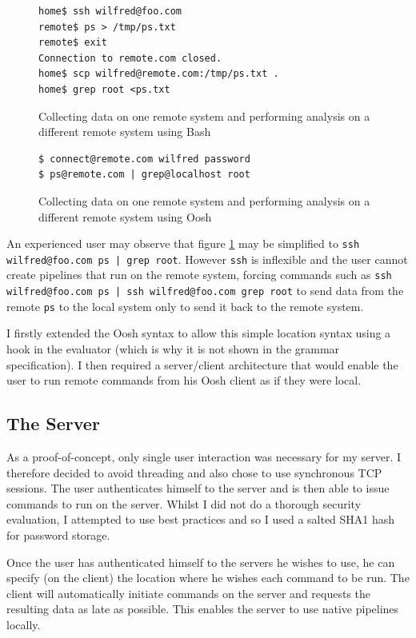 \documentclass[12pt,twoside,notitlepage]{report}
\begin{document}
\begin{figure}[h]
\begin{verbatim}
home$ ssh wilfred@foo.com
remote$ ps > /tmp/ps.txt
remote$ exit
Connection to remote.com closed.
home$ scp wilfred@remote.com:/tmp/ps.txt .
home$ grep root <ps.txt 
\end{verbatim}
\caption{Collecting data on one remote system and performing analysis
  on a different remote system using Bash}
\label{sshremote}
\end{figure}

\begin{figure}[h]
\begin{verbatim}
$ connect@remote.com wilfred password
$ ps@remote.com | grep@localhost root
\end{verbatim}
\caption{Collecting data on one remote system and performing analysis
  on a different remote system using Oosh}
\end{figure}

An experienced user may observe that figure \ref{sshremote} may be
simplified to {\tt ssh wilfred@foo.com ps | grep root}. However {\tt ssh}
is inflexible and the user cannot create pipelines that run on the
remote system, forcing commands such as {\tt ssh wilfred@foo.com ps |
  ssh wilfred@foo.com grep root} to send data from the remote {\tt ps} to the
local system only to send it back to the remote system.

I firstly extended the Oosh syntax to allow this simple location
syntax using a hook in the evaluator (which is why it is not
shown in the grammar specification). I then required a server/client
architecture that would enable the user to run remote commands from
his Oosh client as if they were local.

\subsection{The Server}
As a proof-of-concept, only single user interaction was necessary for
my server. I therefore decided to avoid threading and also chose to
use synchronous TCP sessions. The user authenticates himself to the
server and is then able to issue commands to run on the server. Whilst
I did not do a thorough security evaluation, I attempted to use best
practices and so I used a salted SHA1 hash for password storage.

Once the user has authenticated himself to the servers he wishes to
use, he can specify (on the client) the location where he wishes each
command to be run. The client will automatically initiate commands on the
server and requests the resulting data as late as possible. This
enables the server to use native pipelines locally.
\end{document}
